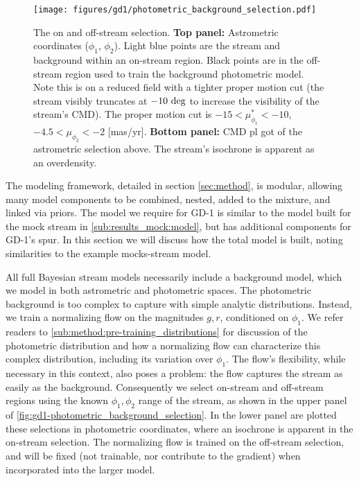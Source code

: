 \documentclass[twocolumn]{aastex631}
\newcommand{\stream}[1]{#1}
\begin{document}
        \begin{figure}
            \centering
            \texttt{[image: figures/gd1/photometric\_background\_selection.pdf]}
            \caption{%
                The on and off-stream selection.
                \textbf{Top panel:} Astrometric coordinates ($\phi_1$,
                $\phi_2$).  Light blue points are the stream and background
                within an on-stream region. Black points are in the off-stream
                region used to train the background photometric model. Note this
                is on a reduced field with a tighter proper motion cut (the
                stream visibly truncates at $-10 \ \rm{deg}$ to increase the
                visibility of the stream's CMD).  The proper motion cut is $-15
                < \mu_{\phi_1}^* < -10$, $-4.5 < \mu_{\phi_2} < -2$ [mas/yr].
                \textbf{Bottom panel:} CMD pl got of the astrometric selection
                above. The stream's isochrone is apparent as an overdensity.
            }
            \label{fig:gd1-photometric_background_selection}
        \end{figure}

        The modeling framework, detailed in section \autoref{sec:method}, is
        modular, allowing many model components to be combined, nested, added to
        the mixture, and linked via priors.  The model we require for
        \stream{GD-1} is similar to the model built for the mock stream in
        \autoref{sub:results_mock:model}, but has additional components for
        \stream{GD-1}'s spur.  In this section we will discuss how the total
        model is built, noting similarities to the example mocks-stream model.

        All full Bayesian stream models necessarily include a background model,
        which we model in both astrometric and photometric spaces.  The
        photometric background is too complex to capture with simple analytic
        distributions.  Instead, we train a normalizing flow on the magnitudes
        $g, r$, conditioned on $\phi_1$. We refer readers to
        \autoref{sub:method:pre-training_distributions} for discussion of the
        photometric distribution and how a normalizing flow can characterize
        this complex distribution, including its variation over $\phi_1$.  The
        flow's flexibility, while necessary in this context, also poses a
        problem: the flow captures the stream as easily as the background.
        Consequently we select on-stream and off-stream regions using the known
        $\phi_1,\phi_2$ range of the stream, as shown in the upper panel of
        \autoref{fig:gd1-photometric_background_selection}.  In the lower panel
        are plotted these selections in photometric coordinates, where an
        isochrone is apparent in the on-stream selection.  The normalizing flow
        is trained on the off-stream selection, and will be fixed (not
        trainable, nor contribute to the gradient) when incorporated into the
        larger model.
\end{document}
